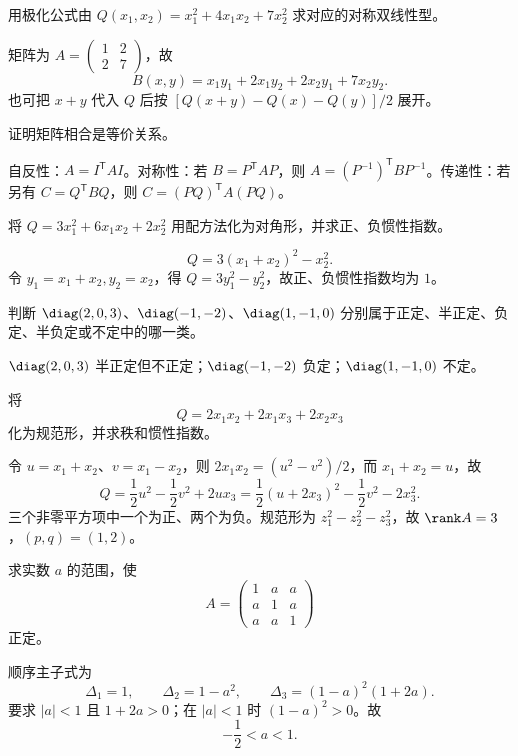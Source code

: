 \begin{exercise}[level=basic]
用极化公式由 $Q(x_1,x_2)=x_1^2+4x_1x_2+7x_2^2$ 求对应的对称双线性型。
\begin{solution}
矩阵为 $A=\begin{pmatrix}1&2\\2&7\end{pmatrix}$，故
\[
B(x,y)=x_1y_1+2x_1y_2+2x_2y_1+7x_2y_2.
\]
也可把 $x+y$ 代入 $Q$ 后按 $[Q(x+y)-Q(x)-Q(y)]/2$ 展开。
\end{solution}
\end{exercise}

\begin{exercise}[level=basic]
证明矩阵相合是等价关系。
\begin{solution}
自反性：$A=I^{\mathsf T}AI$。对称性：若 $B=P^{\mathsf T}AP$，则 $A=(P^{-1})^{\mathsf T}BP^{-1}$。传递性：若另有 $C=Q^{\mathsf T}BQ$，则 $C=(PQ)^{\mathsf T}A(PQ)$。
\end{solution}
\end{exercise}

\begin{exercise}[level=basic]
将 $Q=3x_1^2+6x_1x_2+2x_2^2$ 用配方法化为对角形，并求正、负惯性指数。
\begin{solution}
\[
Q=3(x_1+x_2)^2-x_2^2.
\]
令 $y_1=x_1+x_2,y_2=x_2$，得 $Q=3y_1^2-y_2^2$，故正、负惯性指数均为 $1$。
\end{solution}
\end{exercise}

\begin{exercise}[level=basic]
判断 $\diag(2,0,3)$、$\diag(-1,-2)$、$\diag(1,-1,0)$ 分别属于正定、半正定、负定、半负定或不定中的哪一类。
\begin{solution}
$\diag(2,0,3)$ 半正定但不正定；$\diag(-1,-2)$ 负定；$\diag(1,-1,0)$ 不定。
\end{solution}
\end{exercise}

\begin{exercise}[level=standard]
将
\[
Q=2x_1x_2+2x_1x_3+2x_2x_3
\]
化为规范形，并求秩和惯性指数。
\begin{solution}
令 $u=x_1+x_2$、$v=x_1-x_2$，则 $2x_1x_2=(u^2-v^2)/2$，而 $x_1+x_2=u$，故
\[
Q=\frac12u^2-\frac12v^2+2ux_3
=\frac12(u+2x_3)^2-\frac12v^2-2x_3^2.
\]
三个非零平方项中一个为正、两个为负。规范形为 $z_1^2-z_2^2-z_3^2$，故 $\rank A=3$，$(p,q)=(1,2)$。
\end{solution}
\end{exercise}

\begin{exercise}[level=standard]
求实数 $a$ 的范围，使
\[
A=\begin{pmatrix}1&a&a\\a&1&a\\a&a&1\end{pmatrix}
\]
正定。
\begin{solution}
顺序主子式为
\[
\Delta_1=1,\qquad \Delta_2=1-a^2,\qquad
\Delta_3=(1-a)^2(1+2a).
\]
要求 $|a|<1$ 且 $1+2a>0$；在 $|a|<1$ 时 $(1-a)^2>0$。故
\[
-\frac12<a<1.
\]
\end{solution}
\end{exercise}

